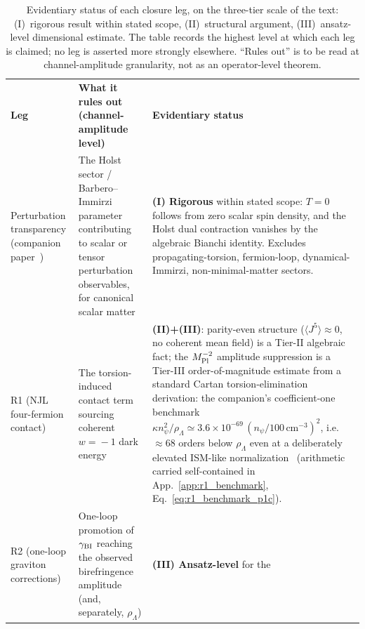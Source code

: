 \documentclass[aps,prd,twocolumn,superscriptaddress,showpacs,preprintnumbers,nofootinbib,longbibliography,floatfix]{revtex4-2}
\begin{document}
\begin{table}[!tb]
\caption{\label{tab:evidentiary_status} Evidentiary status of each closure
leg, on the three-tier scale of the text: (I)~rigorous result within
stated scope, (II)~structural argument, (III)~ansatz-level dimensional
estimate. The table records the highest level at which each leg is
claimed; no leg is asserted more strongly elsewhere. ``Rules
out'' is to be read at channel-amplitude granularity, not as an
operator-level theorem.}
\begin{ruledtabular}
\begin{tabular}{lll}
\textbf{Leg} & \textbf{What it rules out (channel-amplitude level)} &
\textbf{Evidentiary status} \\
\colrule
\parbox[t]{0.18\textwidth}{\raggedright Perturbation transparency
(companion paper~\cite{Golden2026P1a})\strut} &
\parbox[t]{0.40\textwidth}{\raggedright The Holst sector / Barbero--Immirzi
parameter contributing to scalar or tensor perturbation observables, for
canonical scalar matter\strut} &
\parbox[t]{0.32\textwidth}{\raggedright \textbf{(I) Rigorous} within stated
scope: $T=0$ follows from zero scalar spin density, and the Holst dual
contraction vanishes by the algebraic Bianchi identity. Excludes
propagating-torsion, fermion-loop, dynamical-Immirzi, non-minimal-matter
sectors.\strut} \\[3pt]
\parbox[t]{0.18\textwidth}{\raggedright R1 (NJL four-fermion contact)\strut} &
\parbox[t]{0.40\textwidth}{\raggedright The torsion-induced contact term
sourcing coherent $w\!=\!-1$ dark energy\strut} &
\parbox[t]{0.32\textwidth}{\raggedright \textbf{(II)+(III)}: parity-even
structure ($\langle J^5\rangle\!\approx\!0$, no coherent mean field) is a
Tier-II algebraic fact; the $M_{\rm Pl}^{-2}$ amplitude suppression is a
Tier-III order-of-magnitude estimate from a standard Cartan
torsion-elimination derivation: the companion's coefficient-one
benchmark $\kappa n_\psi^2/\rho_\Lambda\simeq
3.6\times10^{-69}\,(n_\psi/100\,\mathrm{cm}^{-3})^2$, i.e.\
${\approx}68$ orders below $\rho_\Lambda$ even at a deliberately
elevated ISM-like normalization~\cite{Golden2026P1a} (arithmetic carried
self-contained in App.~\ref{app:r1_benchmark},
Eq.~\eqref{eq:r1_benchmark_p1c}).\strut} \\[3pt]
\parbox[t]{0.18\textwidth}{\raggedright R2 (one-loop graviton
corrections)\strut} &
\parbox[t]{0.40\textwidth}{\raggedright One-loop promotion of
$\gamma_{\rm BI}$ reaching the observed birefringence amplitude
(and, separately, $\rho_\Lambda$)\strut} &
\parbox[t]{0.32\textwidth}{\raggedright \textbf{(III) Ansatz-level} for the
}
\end{tabular}
\end{ruledtabular}
\end{table}
\end{document}
